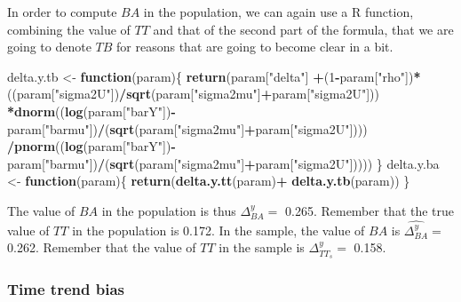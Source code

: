 \documentclass[]{book}
\newenvironment{Shaded}{\begin{snugshade}}{\end{snugshade}}
\newcommand{\ControlFlowTok}[1]{\textcolor[rgb]{0.13,0.29,0.53}{\textbf{#1}}}
\newcommand{\DecValTok}[1]{\textcolor[rgb]{0.00,0.00,0.81}{#1}}
\newcommand{\KeywordTok}[1]{\textcolor[rgb]{0.13,0.29,0.53}{\textbf{#1}}}
\newcommand{\NormalTok}[1]{#1}
\newcommand{\OperatorTok}[1]{\textcolor[rgb]{0.81,0.36,0.00}{\textbf{#1}}}
\newcommand{\StringTok}[1]{\textcolor[rgb]{0.31,0.60,0.02}{#1}}
\theoremstyle{definition}
\theoremstyle{definition}
\theoremstyle{definition}
\theoremstyle{remark}
\begin{document}
In order to compute \(BA\) in the population, we can again use a R function, combining the value of \(TT\) and that of the second part of the formula, that we are going to denote \(TB\) for reasons that are going to become clear in a bit.

\begin{Shaded}
\begin{Highlighting}[]
\NormalTok{delta.y.tb <-}\StringTok{ }\ControlFlowTok{function}\NormalTok{(param)\{}
  \KeywordTok{return}\NormalTok{(param[}\StringTok{"delta"}\NormalTok{]}
          \OperatorTok{+}\NormalTok{(}\DecValTok{1}\OperatorTok{-}\NormalTok{param[}\StringTok{"rho"}\NormalTok{])}\OperatorTok{*}\NormalTok{((param[}\StringTok{"sigma2U"}\NormalTok{])}\OperatorTok{/}\KeywordTok{sqrt}\NormalTok{(param[}\StringTok{"sigma2mu"}\NormalTok{]}\OperatorTok{+}\NormalTok{param[}\StringTok{"sigma2U"}\NormalTok{]))}
         \OperatorTok{*}\KeywordTok{dnorm}\NormalTok{((}\KeywordTok{log}\NormalTok{(param[}\StringTok{"barY"}\NormalTok{])}\OperatorTok{-}\NormalTok{param[}\StringTok{"barmu"}\NormalTok{])}\OperatorTok{/}\NormalTok{(}\KeywordTok{sqrt}\NormalTok{(param[}\StringTok{"sigma2mu"}\NormalTok{]}\OperatorTok{+}\NormalTok{param[}\StringTok{"sigma2U"}\NormalTok{])))}
         \OperatorTok{/}\KeywordTok{pnorm}\NormalTok{((}\KeywordTok{log}\NormalTok{(param[}\StringTok{"barY"}\NormalTok{])}\OperatorTok{-}\NormalTok{param[}\StringTok{"barmu"}\NormalTok{])}\OperatorTok{/}\NormalTok{(}\KeywordTok{sqrt}\NormalTok{(param[}\StringTok{"sigma2mu"}\NormalTok{]}\OperatorTok{+}\NormalTok{param[}\StringTok{"sigma2U"}\NormalTok{]))))}
\NormalTok{\}}
\NormalTok{delta.y.ba <-}\StringTok{ }\ControlFlowTok{function}\NormalTok{(param)\{}
  \KeywordTok{return}\NormalTok{(}\KeywordTok{delta.y.tt}\NormalTok{(param)}\OperatorTok{+}\StringTok{ }\KeywordTok{delta.y.tb}\NormalTok{(param))}
\NormalTok{\}}
\end{Highlighting}
\end{Shaded}

The value of \(BA\) in the population is thus \(\Delta^y_{BA}=\) 0.265.
Remember that the true value of \(TT\) in the population is 0.172.
In the sample, the value of \(BA\) is \(\hat{\Delta^y_{BA}}=\) 0.262.
Remember that the value of \(TT\) in the sample is \(\Delta^y_{TT_s}=\) 0.158.

\hypertarget{time-trend-bias}{%
\subsubsection{Time trend bias}\label{time-trend-bias}}
\end{document}
